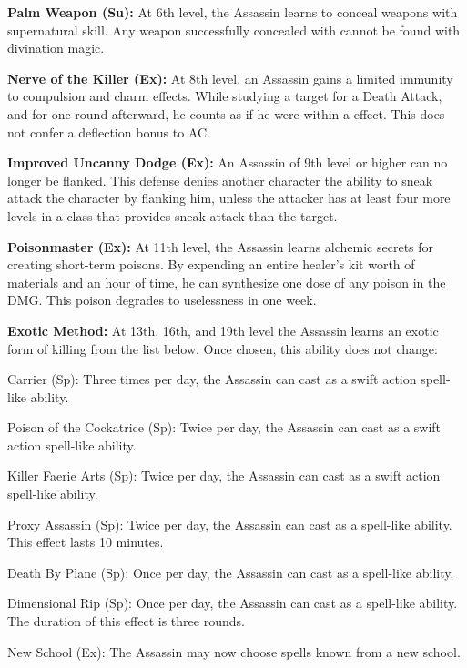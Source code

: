 \textbf{Palm Weapon (Su):} At 6th level, the Assassin learns to conceal weapons with supernatural skill. Any weapon successfully concealed with  cannot be found with divination magic.

\textbf{Nerve of the Killer (Ex):} At 8th level, an Assassin gains a limited immunity to compulsion and charm effects. While studying a target for a Death Attack, and for one round afterward, he counts as if he were within a  effect. This does not confer a deflection bonus to AC.

\textbf{Improved Uncanny Dodge (Ex):} An Assassin of 9th level or higher can no longer be flanked. This defense denies another character the ability to sneak attack the character by flanking him, unless the attacker has at least four more levels in a class that provides sneak attack than the target.

\textbf{Poisonmaster (Ex):} At 11th level, the Assassin learns alchemic secrets for creating short-term poisons. By expending an entire healer's kit worth of materials and an hour of time, he can synthesize one dose of any poison in the DMG. This poison degrades to uselessness in one week.

\textbf{Exotic Method:} At 13th, 16th, and 19th level the Assassin learns an exotic form of killing from the list below. Once chosen, this ability does not change:

\begin{description*}
\item[Carrier (Sp):] Three times per day, the Assassin can cast  as a swift action spell-like ability.
\item[Poison of the Cockatrice (Sp):] Twice per day, the Assassin can cast  as a swift action spell-like ability.
\item[Killer Faerie Arts (Sp):] Twice per day, the Assassin can cast  as a swift action spell-like ability.
\item[Proxy Assassin (Sp):] Twice per day, the Assassin can cast  as a spell-like ability. This effect lasts 10 minutes.
\item[Death By Plane (Sp):] Once per day, the Assassin can cast  as a spell-like ability.
\item[Dimensional Rip (Sp):] Once per day, the Assassin can cast  as a spell-like ability. The duration of this effect is three rounds.
\item[New School (Ex):] The Assassin may now choose spells known from a new school.
\end{description*}

